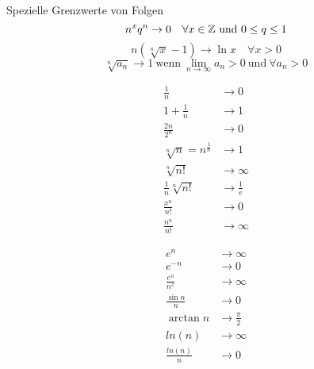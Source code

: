 \begin{highlight}{Spezielle Grenzwerte von Folgen}
    \begin{equation*}
        n^x q^n \to 0 \quad \forall x \in \mathbb{Z}~\text{und}~0 \leq q \leq 1
    \end{equation*}
    \begin{equation*}
         n(\sqrt[n]{x} - 1) \to \ln x \quad \forall x>0
    \end{equation*}
    \begin{equation*}
        \sqrt[n]{a_n} \to 1 ~\text{wenn}~ \lim_{n \to \infty} a_n > 0 ~\text{und}~ \forall a_n > 0 
    \end{equation*}
    \begin{center}
        \begin{minipage}{0.3\linewidth}
            \begin{align*}
                \frac{1}{n} &\to 0\\
                1 + \frac{1}{n} &\to 1\\
                \frac{2n}{2^n} &\to 0\\
                \sqrt[n]{n} = n^{\frac{1}{n}} &\to 1\\
                \sqrt[n]{n!} &\to \infty\\
                \frac{1}{n}\sqrt[n]{n!} &\to \frac{1}{e}\\
                \frac{x^n}{n!} &\to 0\\
                \frac{n^n}{n!} &\to \infty
            \end{align*}
        \end{minipage}
        \hfill\vline\hfill
        \begin{minipage}{0.3\linewidth}
            \begin{align*}
                e^n &\to \infty\\
                e^{-n} &\to 0\\
                \frac{e^n}{n^x} &\to \infty\\
                \frac{\sin n}{n} &\to 0\\
                \arctan n &\to \frac{\pi}{2}\\
                ln(n) &\to \infty\\
                \frac{ln(n)}{n} &\to 0\\

\end{align*}
\end{minipage}
\end{center}
\end{highlight}
